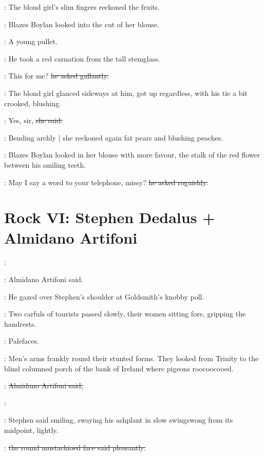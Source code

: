 :
The blond girl's slim fingers reckoned the fruits.

:
Blazes Boylan looked into the cut of her blouse.

\boylanint:
A young pullet.

:
He took a red carnation from the tall stemglass.

\boylan:
This for me?
\sout{he asked gallantly.}

:
The blond girl glanced sideways at him,%
got up regardless,
with his tie a bit crooked,
blushing.

\blondgirl:
Yes, sir,
\sout{she said.}

:
Bending archly |
she reckoned again fat pears and blushing peaches.

:
Blazes Boylan looked in her blouse with more favour,
the stalk of the red flower between his smiling teeth.

\boylan:
May I say a word to your telephone, missy?
\sout{he asked roguishly.}


\section*{Rock VI: Stephen Dedalus + Almidano Artifoni}


\artifoni:

:
Almidano Artifoni said.

:
He gazed over Stephen's shoulder at Goldsmith's knobby poll.

:
Two carfuls of tourists passed slowly,%
their women sitting fore,
gripping the handrests.

\StephenInt:
Palefaces.

:
Men's arms frankly round their stunted forms.
They looked from Trinity
to the blind columned porch of the bank of Ireland
where pigeons roocoocooed.

\artifoni:
\sout{Almidano Artifoni said,}

\Stephen:

:
Stephen said smiling,
swaying his ashplant in slow swingswong from its midpoint,
lightly.

\artifoni:
\sout{the round mustachioed face said pleasantly.}%

